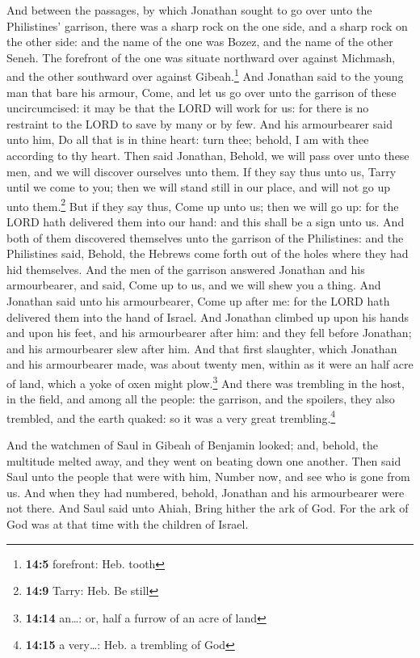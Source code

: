  And between the passages, by which Jonathan sought to go
over unto the Philistines' garrison, there was a sharp rock on the one
side, and a sharp rock on the other side: and the name of the one was
Bozez, and the name of the other Seneh.  The forefront of
the one was situate northward over against Michmash, and the other
southward over against Gibeah.\footnote{\textbf{14:5} forefront: Heb.
  tooth}  And Jonathan said to the young man that bare his
armour, Come, and let us go over unto the garrison of these
uncircumcised: it may be that the LORD will work for us: for there is no
restraint to the LORD to save by many or by few.  And his
armourbearer said unto him, Do all that is in thine heart: turn thee;
behold, I am with thee according to thy heart.  Then said
Jonathan, Behold, we will pass over unto these men, and we will discover
ourselves unto them.  If they say thus unto us, Tarry
until we come to you; then we will stand still in our place, and will
not go up unto them.\footnote{\textbf{14:9} Tarry: Heb. Be still}
 But if they say thus, Come up unto us; then we will go
up: for the LORD hath delivered them into our hand: and this shall be a
sign unto us.  And both of them discovered themselves
unto the garrison of the Philistines: and the Philistines said, Behold,
the Hebrews come forth out of the holes where they had hid themselves.
 And the men of the garrison answered Jonathan and his
armourbearer, and said, Come up to us, and we will shew you a thing. And
Jonathan said unto his armourbearer, Come up after me: for the LORD hath
delivered them into the hand of Israel.  And Jonathan
climbed up upon his hands and upon his feet, and his armourbearer after
him: and they fell before Jonathan; and his armourbearer slew after him.
 And that first slaughter, which Jonathan and his
armourbearer made, was about twenty men, within as it were an half acre
of land, which a yoke of oxen might plow.\footnote{\textbf{14:14}
  an\ldots: or, half a furrow of an acre of land}  And
there was trembling in the host, in the field, and among all the people:
the garrison, and the spoilers, they also trembled, and the earth
quaked: so it was a very great trembling.\footnote{\textbf{14:15} a
  very\ldots: Heb. a trembling of God}

 And the watchmen of Saul in Gibeah of Benjamin looked;
and, behold, the multitude melted away, and they went on beating down
one another.  Then said Saul unto the people that were
with him, Number now, and see who is gone from us. And when they had
numbered, behold, Jonathan and his armourbearer were not there.
 And Saul said unto Ahiah, Bring hither the ark of God.
For the ark of God was at that time with the children of Israel.

